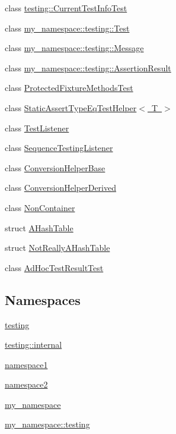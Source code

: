 \begin{DoxyCompactItemize}
class \mbox{\hyperlink{classtesting_1_1_current_test_info_test}{testing\+::\+Current\+Test\+Info\+Test}}
\item 
class \mbox{\hyperlink{classmy__namespace_1_1testing_1_1_test}{my\+\_\+namespace\+::testing\+::\+Test}}
\item 
class \mbox{\hyperlink{classmy__namespace_1_1testing_1_1_message}{my\+\_\+namespace\+::testing\+::\+Message}}
\item 
class \mbox{\hyperlink{classmy__namespace_1_1testing_1_1_assertion_result}{my\+\_\+namespace\+::testing\+::\+Assertion\+Result}}
\item 
class \mbox{\hyperlink{class_protected_fixture_methods_test}{Protected\+Fixture\+Methods\+Test}}
\item 
class \mbox{\hyperlink{class_static_assert_type_eq_test_helper}{Static\+Assert\+Type\+Eq\+Test\+Helper$<$ T $>$}}
\item 
class \mbox{\hyperlink{class_test_listener}{Test\+Listener}}
\item 
class \mbox{\hyperlink{class_sequence_testing_listener}{Sequence\+Testing\+Listener}}
\item 
class \mbox{\hyperlink{class_conversion_helper_base}{Conversion\+Helper\+Base}}
\item 
class \mbox{\hyperlink{class_conversion_helper_derived}{Conversion\+Helper\+Derived}}
\item 
class \mbox{\hyperlink{class_non_container}{Non\+Container}}
\item 
struct \mbox{\hyperlink{struct_a_hash_table}{A\+Hash\+Table}}
\item 
struct \mbox{\hyperlink{struct_not_really_a_hash_table}{Not\+Really\+A\+Hash\+Table}}
\item 
class \mbox{\hyperlink{class_ad_hoc_test_result_test}{Ad\+Hoc\+Test\+Result\+Test}}
\end{DoxyCompactItemize}
\subsection*{Namespaces}
\begin{DoxyCompactItemize}
\item 
 \mbox{\hyperlink{namespacetesting}{testing}}
\item 
 \mbox{\hyperlink{namespacetesting_1_1internal}{testing\+::internal}}
\item 
 \mbox{\hyperlink{namespacenamespace1}{namespace1}}
\item 
 \mbox{\hyperlink{namespacenamespace2}{namespace2}}
\item 
 \mbox{\hyperlink{namespacemy__namespace}{my\+\_\+namespace}}
\item 
 \mbox{\hyperlink{namespacemy__namespace_1_1testing}{my\+\_\+namespace\+::testing}}
\end{DoxyCompactItemize}
